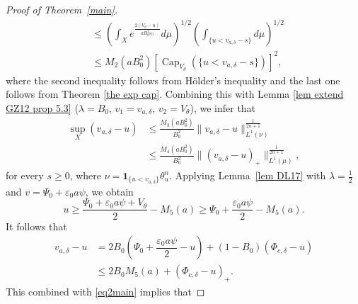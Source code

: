\documentclass[a4paper,11pt]{amsart}
\numberwithin{equation}{section}
\theoremstyle{definition}
\newcommand{\capacity}{\mathop{\mathrm{Cap}}\nolimits}
\begin{document}
\begin{proof}[Proof of Theorem~\ref{main}]
\begin{align*}
&\leq \left(\int_{X}e^{\frac{2(V_{\theta}-u)}{aB_0^2\varepsilon_0}}d\mu\right)^{1/2} \left(\int_{\{u<v_{a, \delta}-s\}}d\mu\right)^{1/2}\\
&\leq M_2(aB_0^2)\left[\capacity_{V_{\theta}}(\{u<v_{a, \delta}-s\})\right]^{2},
 \end{align*}
 where the second inequality follows from H\"older's inequality and the last one follows from Theorem \ref{the exp cap}.
  Combining this with Lemma \ref{lem extend GZ12 prop 5.3} ($\lambda=B_0$, $v_1=v_{a,\delta}$, $v_2=V_\theta$), we infer that
\begin{equation}\label{eq2main}
\begin{split}
    \sup_X (v_{a, \delta}-u)&\leq \frac{M_3(aB_0^2)}{B_0^2}\|v_{a, \delta}-u\|^{\frac{1}{2n+1}}_{L^1(\nu)}\\
&\leq \frac{M_4(aB_0^2)}{B_0^2}\|(v_{a, \delta}-u)_+\|^{\frac{1}{2n+1}}_{L^1(\mu)},
\end{split}
\end{equation}
for every $s\geq 0$, where $\nu=\mathbf{1}_{\{u<v_{a, \delta}\}}\theta_u^n$.
Applying Lemma~\ref{lem DL17} with $\lambda=\frac{1}{2}$ and $v=\Psi_0+\varepsilon_0a\psi$, we obtain 
\begin{equation}\label{eq0.1main}
	u\geq \dfrac{\Psi_0+\varepsilon_0a\psi+V_{\theta}}{2}-M_5(a)\geq \Psi_0+\dfrac{\varepsilon_0a\psi}{2}-M_5(a).
\end{equation}
It follows that
\begin{align*}
v_{a, \delta}-u&=2B_0(\Psi_0+\dfrac{\varepsilon_0a\psi}{2}-u)+(1-B_0)(\Phi_{c, \delta}-u)\\
&\leq 2B_0 M_5(a)+(\Phi_{c, \delta}-u)_+.
\end{align*}
This combined with \eqref{eq2main} implies that


\end{proof}
\end{document}

